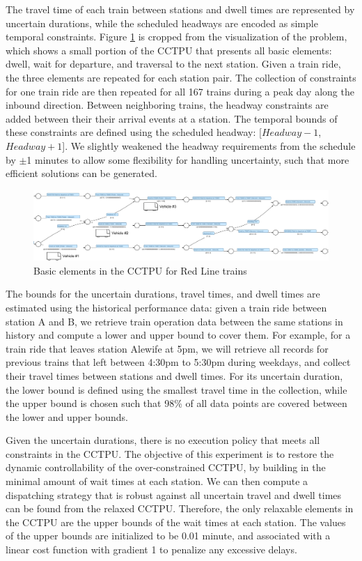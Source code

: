 \documentclass[jair,twoside,11pt,theapa]{article}
\begin{document}
The travel time of each train between stations and dwell times are represented
by uncertain durations, while the scheduled headways are encoded as simple
temporal constraints. Figure \ref{fig:mbta_cctpu_example} is cropped from the
visualization of the problem, which shows a small portion of the CCTPU that
presents all basic elements: dwell, wait for departure, and traversal to the
next station. Given a train ride, the three elements are repeated for each
station pair. The collection of constraints for one train ride are then repeated
for all 167 trains during a peak day along the inbound direction. Between
neighboring trains, the headway constraints are added between their their
arrival events at a station. The temporal bounds of these constraints are
defined using the scheduled headway: [$Headway-1$,$Headway+1$]. We slightly
weakened the headway requirements from the schedule by $\pm$1 minutes to allow
some flexibility for handling uncertainty, such that more efficient solutions
can be generated.


\begin{figure}[htb]
	\centering
	\includegraphics[width=1\textwidth]{figures/MBTA/headway.pdf}
	\caption{Basic elements in the CCTPU for Red Line trains}
	\label{fig:mbta_cctpu_example}
\end{figure}


The bounds for the uncertain durations, travel times, and dwell times are
estimated using the historical performance data: given a train ride between
station A and B, we retrieve train operation data between the same stations in
history and compute a lower and upper bound to cover them. For example, for a
train ride that leaves station Alewife at 5pm, we will retrieve all records for
previous trains that left between 4:30pm to 5:30pm during weekdays, and collect
their travel times between stations and dwell times. For its uncertain duration,
the lower bound is defined using the smallest travel time in the collection,
while the upper bound is chosen such that 98\% of all data points are covered
between the lower and upper bounds.


Given the uncertain durations, there is no execution policy that meets all
constraints in the CCTPU. The objective of this experiment is to restore the
dynamic controllability of the over-constrained CCTPU, by building in the
minimal amount of wait times at each station. We can then compute a dispatching
strategy that is robust against all uncertain travel and dwell times can be
found from the relaxed CCTPU. Therefore, the only relaxable elements in the
CCTPU are the upper bounds of the wait times at each station. The values of the
upper bounds are initialized to be 0.01 minute, and associated with a linear
cost function with gradient 1 to penalize any excessive delays.
\end{document}
